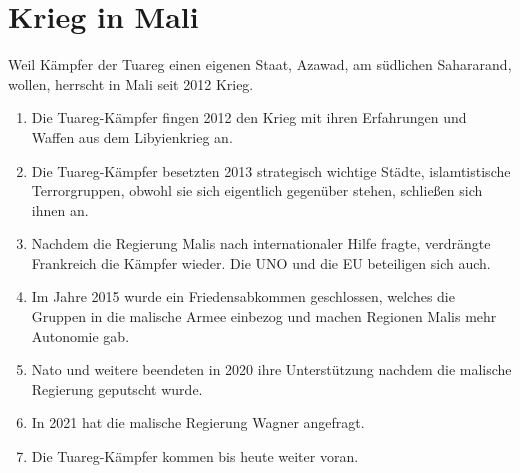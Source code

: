 \documentclass{article}
\begin{document}
\section{Krieg in Mali} 
Weil Kämpfer der Tuareg einen eigenen Staat, Azawad, am südlichen Sahararand, wollen, herrscht in Mali seit 2012 Krieg. 
\begin{enumerate}
 \item Die Tuareg-Kämpfer fingen 2012 den Krieg mit ihren Erfahrungen und Waffen aus dem Libyienkrieg an.
 \item Die Tuareg-Kämpfer besetzten 2013 strategisch wichtige Städte, islamtistische Terrorgruppen, obwohl sie sich eigentlich gegenüber stehen, schließen sich ihnen an. 
 \item Nachdem die Regierung Malis nach internationaler Hilfe fragte, verdrängte Frankreich die Kämpfer wieder. Die UNO und die EU beteiligen sich auch.
 \item Im Jahre 2015 wurde ein Friedensabkommen geschlossen, welches die Gruppen in die malische Armee einbezog und machen Regionen Malis mehr Autonomie gab. 
 \item Nato und weitere beendeten in 2020 ihre Unterstützung nachdem die malische Regierung geputscht wurde.
 \item In 2021 hat die malische Regierung Wagner angefragt.
 \item Die Tuareg-Kämpfer kommen bis heute weiter voran. 
\end{enumerate} 
\end{document}

